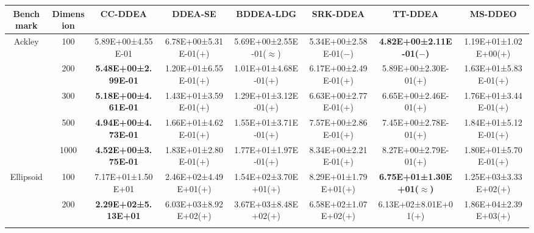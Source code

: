 \begin{tabular}{|cc|c|c|c|c|c|c|}
\hline
\multicolumn{1}{|c|}{Benchmark}                   & Dimension & CC-DDEA                    & DDEA-SE                & BDDEA-LDG                    & SRK-DDEA                     & TT-DDEA                               & MS-DDEO                \\ \hline
\multicolumn{1}{|c|}{\multirow{5}{*}{Ackley}}     & 100       & 5.89E+00±4.55E-01          & 6.78E+00±5.31E-01($+$) & 5.69E+00±2.55E-01($\approx$) & 5.34E+00±2.58E-01($-$)       & \textbf{4.82E+00±2.11E-01($-$)}       & 1.19E+01±1.02E+00($+$) \\ \cline{2-8} 
\multicolumn{1}{|c|}{}                            & 200       & \textbf{5.48E+00±2.99E-01} & 1.20E+01±6.55E-01($+$) & 1.01E+01±4.68E-01($+$)       & 6.17E+00±2.49E-01($+$)       & 5.89E+00±2.30E-01($+$)                & 1.63E+01±5.83E-01($+$) \\ \cline{2-8} 
\multicolumn{1}{|c|}{}                            & 300       & \textbf{5.18E+00±4.61E-01} & 1.43E+01±3.59E-01($+$) & 1.29E+01±3.12E-01($+$)       & 6.63E+00±2.77E-01($+$)       & 6.65E+00±2.46E-01($+$)                & 1.76E+01±3.44E-01($+$) \\ \cline{2-8} 
\multicolumn{1}{|c|}{}                            & 500       & \textbf{4.94E+00±4.73E-01} & 1.66E+01±4.62E-01($+$) & 1.55E+01±3.71E-01($+$)       & 7.57E+00±2.86E-01($+$)       & 7.45E+00±2.78E-01($+$)                & 1.84E+01±5.12E-01($+$) \\ \cline{2-8} 
\multicolumn{1}{|c|}{}                            & 1000      & \textbf{4.52E+00±3.75E-01} & 1.83E+01±2.80E-01($+$) & 1.77E+01±1.97E-01($+$)       & 8.34E+00±2.21E-01($+$)       & 8.27E+00±2.79E-01($+$)                & 1.80E+01±5.70E-01($+$) \\ \hline
\multicolumn{1}{|c|}{\multirow{5}{*}{Ellipsoid}}  & 100       & 7.17E+01±1.50E+01          & 2.46E+02±4.49E+01($+$) & 1.54E+02±3.70E+01($+$)       & 8.29E+01±1.79E+01($+$)       & \textbf{6.75E+01±1.30E+01($\approx$)} & 1.25E+03±3.33E+02($+$) \\ \cline{2-8} 
\multicolumn{1}{|c|}{}                            & 200       & \textbf{2.29E+02±5.13E+01} & 6.03E+03±8.92E+02($+$) & 3.67E+03±8.48E+02($+$)       & 6.58E+02±1.07E+02($+$)       & 6.13E+02±8.01E+01($+$)                & 1.86E+04±2.39E+03($+$) \\ \cline{2-8} 

\end{tabular}
